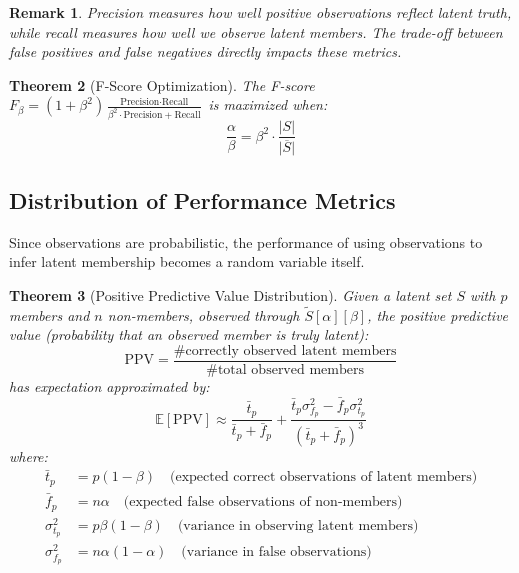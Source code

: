 \documentclass[11pt,final,hidelinks]{article}
\newtheorem{theorem}{Theorem}[section]
\newtheorem{remark}[theorem]{Remark}
\newcommand{\obs}[1]{\widetilde{#1}}  %
\newcommand{\SetComplement}[1]{\overline{#1}}
\newcommand{\Card}[1]{\lvert#1\rvert}
\newcommand{\fprate}{\alpha}
\newcommand{\fnrate}{\beta}
\begin{document}
\begin{remark}
Precision measures how well positive observations reflect latent truth, while recall measures how well we observe latent members. The trade-off between false positives and false negatives directly impacts these metrics.
\end{remark}

\begin{theorem}[F-Score Optimization]
The F-score $F_\beta = (1+\beta^2) \frac{\text{Precision} \cdot \text{Recall}}{\beta^2 \cdot \text{Precision} + \text{Recall}}$ is maximized when:
\begin{equation}
\frac{\fprate}{\fnrate} = \beta^2 \cdot \frac{\Card{S}}{\Card{\SetComplement{S}}}
\end{equation}
\end{theorem}

\subsection{Distribution of Performance Metrics}

Since observations are probabilistic, the performance of using observations to infer latent membership becomes a random variable itself.

\begin{theorem}[Positive Predictive Value Distribution]
Given a latent set $S$ with $p$ members and $n$ non-members, observed through $\obs{S}[\fprate][\fnrate]$, the positive predictive value (probability that an observed member is truly latent):
\begin{equation}
\text{PPV} = \frac{\text{\# correctly observed latent members}}{\text{\# total observed members}}
\end{equation}
has expectation approximated by:
\begin{equation}
\mathbb{E}[\text{PPV}] \approx \frac{\bar{t}_p}{\bar{t}_p + \bar{f}_p} + \frac{\bar{t}_p \sigma_{f_p}^2 - \bar{f}_p \sigma_{t_p}^2}{(\bar{t}_p + \bar{f}_p)^3}
\end{equation}
where:
\begin{align}
\bar{t}_p &= p(1-\fnrate) \quad \text{(expected correct observations of latent members)} \\
\bar{f}_p &= n\fprate \quad \text{(expected false observations of non-members)} \\
\sigma_{t_p}^2 &= p\fnrate(1-\fnrate) \quad \text{(variance in observing latent members)} \\
\sigma_{f_p}^2 &= n\fprate(1-\fprate) \quad \text{(variance in false observations)}
\end{align}
\end{theorem}
\end{document}
